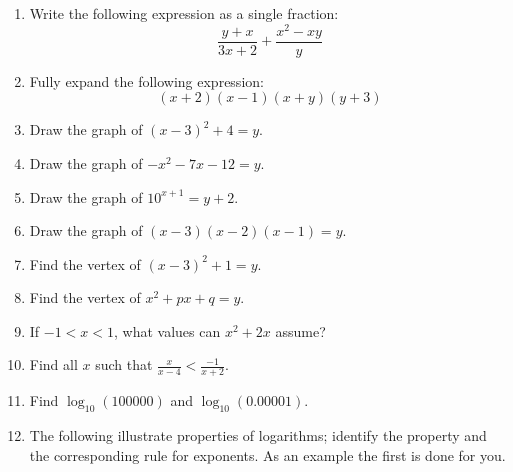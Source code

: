 \documentclass{exam}
\theoremstyle{definition}
\begin{document}
\begin{enumerate}
  \item Write the following expression as a single fraction:
    \begin{displaymath}
      \frac{y + x}{3x + 2} + \frac{x^2 - xy}{y}
    \end{displaymath}
  \item Fully expand the following expression:
    \begin{displaymath}
      (x + 2)(x - 1)(x + y)(y + 3)
    \end{displaymath}
  \item Draw the graph of $ (x - 3)^2 + 4 = y $.
  \item Draw the graph of $ -x^2 - 7x - 12 = y $.
  \item Draw the graph of $ 10^{x + 1} = y + 2 $.
  \item Draw the graph of $ (x - 3)(x - 2)(x - 1) = y $.
  \item Find the vertex of $ (x - 3)^2 + 1 = y $.
  \item Find the vertex of $ x^2 + px + q = y $.
  \item If $ -1 < x < 1 $, what values can $ x^2 + 2x $ assume?
  \item Find all $ x $ such that $ \frac{x}{x - 4} < \frac{-1}{x + 2} $.
  \item Find $ \log_{10} (100000) $ and $ \log_{10} (0.00001) $.
  \item The following illustrate properties of logarithms; identify the property and the corresponding rule for
        exponents. As an example the first is done for you.
\end{enumerate}
\end{document}
